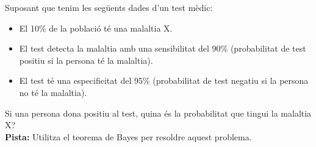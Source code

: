 \documentclass[12pt]{article}
\begin{document}
\begin{exercici} \noindent 
Suposant que tenim les següents dades d'un test mèdic:

\begin{itemize}
    \item El 10\% de la població té una malaltia X.
    \item El test detecta la malaltia amb una sensibilitat del 90\% (probabilitat de test positiu si la persona té la malaltia).
    \item El test té una especificitat del 95\% (probabilitat de test negatiu si la persona no té la malaltia).
\end{itemize}

Si una persona dona positiu al test, quina és la probabilitat que tingui la malaltia X?\\

\textbf{Pista:} Utilitza el teorema de Bayes per resoldre aquest problema.
\end{exercici}
\end{document}
